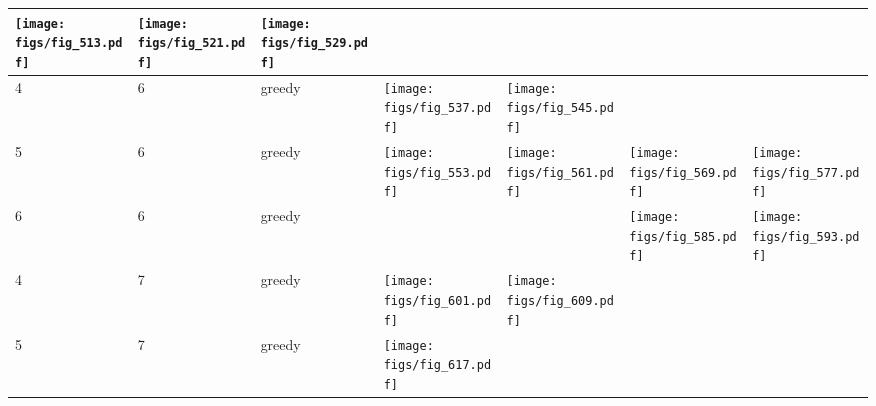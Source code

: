 \documentclass[oneside,canadian,landscape]{article}
\begin{document}
\begin{center}
\begin{longtable}{|l|l|l||l|l|l|l|}
\begin{minipage}{3.5cm}
\texttt{[image: figs/fig\_513.pdf]}
\end{minipage}
&\begin{minipage}{3.5cm}
\texttt{[image: figs/fig\_521.pdf]}
\end{minipage}
&\begin{minipage}{3.5cm}
\texttt{[image: figs/fig\_529.pdf]}
\end{minipage}
\\ \hline
4&6&greedy&\begin{minipage}{3.5cm}
\texttt{[image: figs/fig\_537.pdf]}
\end{minipage}
&\begin{minipage}{3.5cm}
\texttt{[image: figs/fig\_545.pdf]}
\end{minipage}
&&\\ \hline
5&6&greedy&\begin{minipage}{3.5cm}
\texttt{[image: figs/fig\_553.pdf]}
\end{minipage}
&\begin{minipage}{3.5cm}
\texttt{[image: figs/fig\_561.pdf]}
\end{minipage}
&\begin{minipage}{3.5cm}
\texttt{[image: figs/fig\_569.pdf]}
\end{minipage}
&\begin{minipage}{3.5cm}
\texttt{[image: figs/fig\_577.pdf]}
\end{minipage}
\\ \hline
6&6&greedy&&&\begin{minipage}{3.5cm}
\texttt{[image: figs/fig\_585.pdf]}
\end{minipage}
&\begin{minipage}{3.5cm}
\texttt{[image: figs/fig\_593.pdf]}
\end{minipage}
\\ \hline
4&7&greedy&\begin{minipage}{3.5cm}
\texttt{[image: figs/fig\_601.pdf]}
\end{minipage}
&\begin{minipage}{3.5cm}
\texttt{[image: figs/fig\_609.pdf]}
\end{minipage}
&&\\ \hline
5&7&greedy&\begin{minipage}{3.5cm}
\texttt{[image: figs/fig\_617.pdf]}
\end{minipage}
&\begin{minipage}{3.5cm}

\end{minipage}
\end{longtable}
\end{center}
\end{document}
